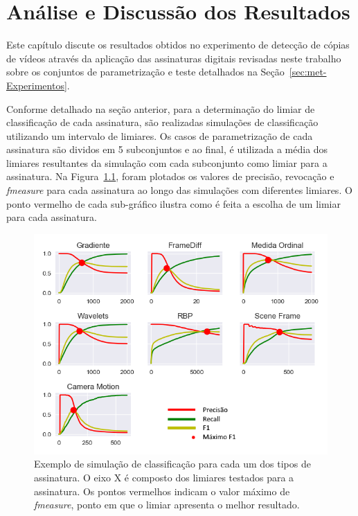 
\chapter{Análise e Discussão dos Resultados}
\label{chap:resultados}

Este capítulo discute os resultados obtidos no experimento de detecção de cópias de vídeos através da aplicação das assinaturas digitais revisadas neste trabalho sobre os conjuntos de parametrização e teste detalhados na Seção~\ref{sec:met-Experimentos}.

Conforme detalhado na seção anterior, para a determinação do limiar de classificação de cada assinatura, são realizadas simulações de classificação utilizando um intervalo de limiares. Os casos de parametrização de cada assinatura são dividos em 5 subconjuntos e ao final, é utilizada a média dos limiares resultantes da simulação com cada subconjunto como limiar para a assinatura. Na Figura~\ref{fig:todos-limiares}, foram plotados os valores de precisão, revocação e \textit{fmeasure} para cada assinatura ao longo das simulações com diferentes limiares. O ponto vermelho de cada sub-gráfico ilustra como é feita a escolha de um limiar para cada assinatura.


\begin{figure}[h]
	\centering
	\caption{Exemplo de simulação de classificação para cada um dos tipos de assinatura. O eixo X é composto dos limiares testados para a assinatura. Os pontos vermelhos indicam o valor máximo de \textit{fmeasure}, ponto em que o limiar apresenta o melhor resultado.}
	\label{fig:todos-limiares}
	\includegraphics[width=\textwidth]{dados/figuras/experimentos/todos_final.png}
\end{figure}

